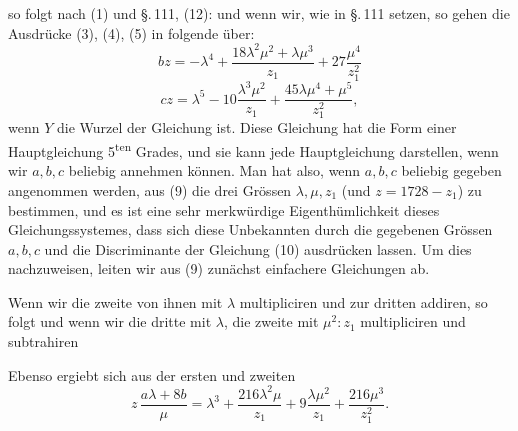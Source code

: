
so folgt nach (1) und \S.\,111, (12):
und wenn wir, wie in \S.\,111
setzen, so gehen die Ausdr\"ucke (3), (4), (5) in folgende \"uber:
\[
bz = -\lambda^4 + \frac{18\lambda^2\mu^2 + \lambda\mu^3}{z_1} + 27\frac{\mu^4}{z_1^2}
\]
\[
cz = \lambda^5 - 10\frac{\lambda^3\mu^2}{z_1} + \frac{45\lambda\mu^4 + \mu^5}{z_1^2},
\]
wenn $Y$ die Wurzel der Gleichung
ist. Diese Gleichung hat die Form einer Hauptgleichung 5\textsuperscript{ten} Grades, und sie kann jede Hauptgleichung darstellen, wenn wir $a, b, c$ beliebig annehmen k\"onnen. Man hat also, wenn $a, b, c$ beliebig gegeben angenommen werden, aus (9) die drei Gr\"ossen $\lambda, \mu, z_1$ (und $z = 1728 - z_1$) zu bestimmen, und es ist eine sehr merkw\"urdige Eigenth\"umlichkeit dieses Gleichungssystemes, dass sich diese Unbekannten  durch die gegebenen Gr\"ossen $a, b, c$ und die Discriminante der Gleichung (10) ausdr\"ucken lassen. Um dies nachzuweisen, leiten wir aus (9) zun\"achst einfachere Gleichungen ab.

Wenn wir die zweite von ihnen mit $\lambda$ multipliciren und zur dritten addiren, so folgt
und wenn wir die dritte mit $\lambda$, die zweite mit $\mu^2 : z_1$ multipliciren und subtrahiren

Ebenso ergiebt sich aus der ersten und zweiten
\[
z\,\frac{a\lambda + 8b}{\mu} = \lambda^3 + \frac{216\lambda^2\mu}{z_1} + 9\frac{\lambda\mu^2}{z_1} + \frac{216\mu^3}{z_1^2}.
\]
